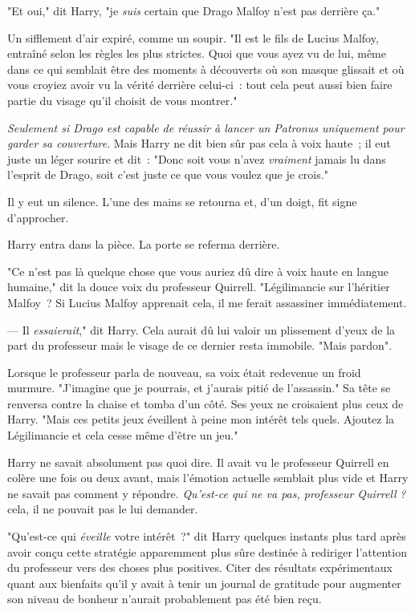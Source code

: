 "Et oui," dit Harry, "je \emph{suis} certain que Drago Malfoy n'est pas derrière ça."

Un sifflement d'air expiré, comme un soupir. "Il est le fils de Lucius Malfoy, entraîné selon les règles les plus strictes. Quoi que vous ayez vu de lui, même dans ce qui semblait être des moments à découverts où son masque glissait et où vous croyiez avoir vu la vérité derrière celui-ci~: tout cela peut aussi bien faire partie du visage qu'il choisit de vous montrer."

\emph{Seulement si Drago est capable de réussir à lancer un Patronus uniquement pour garder sa couverture}. Mais Harry ne dit bien sûr pas cela à voix haute~; il eut juste un léger sourire et dit~: "Donc soit vous n'avez \emph{vraiment} jamais lu dans l'esprit de Drago, soit c'est juste ce que vous voulez que je crois."

Il y eut un silence. L'une des mains se retourna et, d'un doigt, fit signe d'approcher.

Harry entra dans la pièce. La porte se referma derrière.

"Ce n'est pas là quelque chose que vous auriez dû dire à voix haute en langue humaine," dit la douce voix du professeur Quirrell. "Légilimancie sur l'héritier Malfoy~? Si Lucius Malfoy apprenait cela, il me ferait assassiner immédiatement.

--- Il \emph{essaierait}," dit Harry. Cela aurait dû lui valoir un plissement d'yeux de la part du professeur mais le visage de ce dernier resta immobile. "Mais pardon".

Lorsque le professeur parla de nouveau, sa voix était redevenue un froid murmure. "J'imagine que je pourrais, et j'aurais pitié de l'assassin." Sa tête se renversa contre la chaise et tomba d'un côté. Ses yeux ne croisaient plus ceux de Harry. "Mais ces petits jeux éveillent à peine mon intérêt tels quels. Ajoutez la Légilimancie et cela cesse même d'être un jeu."

Harry ne savait absolument pas quoi dire. Il avait vu le professeur Quirrell en colère une fois ou deux avant, mais l'émotion actuelle semblait plus vide et Harry ne savait pas comment y répondre. \emph{Qu'est-ce qui ne va pas, professeur Quirrell} \emph{?} cela, il ne pouvait pas le lui demander.

"Qu'est-ce qui \emph{éveille} votre intérêt~?" dit Harry quelques instants plus tard après avoir conçu cette stratégie apparemment plus sûre destinée à rediriger l'attention du professeur vers des choses plus positives. Citer des résultats expérimentaux quant aux bienfaits qu'il y avait à tenir un journal de gratitude pour augmenter son niveau de bonheur n'aurait probablement pas été bien reçu.

